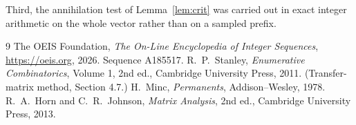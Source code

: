 \documentclass[11pt,a4paper]{article}
\theoremstyle{plain}
\theoremstyle{definition}
\begin{document}
Third, the annihilation test of Lemma~\ref{lem:crit} was carried out in exact integer
arithmetic on the whole vector rather than on a sampled prefix.

\begin{thebibliography}{9}
 The OEIS Foundation, \emph{The On-Line Encyclopedia of Integer
Sequences}, \url{https://oeis.org}, 2026. Sequence A185517.
 R.~P.~Stanley, \emph{Enumerative Combinatorics}, Volume 1, 2nd ed.,
Cambridge University Press, 2011. (Transfer-matrix method, Section 4.7.)
 H.~Minc, \emph{Permanents}, Addison--Wesley, 1978.
 R.~A.~Horn and C.~R.~Johnson, \emph{Matrix Analysis}, 2nd ed., Cambridge
University Press, 2013.
\end{thebibliography}
\end{document}
